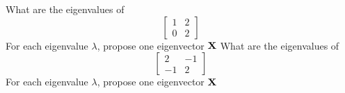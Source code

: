 

\bexo
What are the eigenvalues of 
\begin{equation*}
\left[
\begin{array}{cc}
1 & 2 \\
0 & 2
\end{array}
\right]
\end{equation*}
For each eigenvalue $\lambda$, propose one eigenvector $\textbf{X}$
\eexo{}
\bexo
What are the eigenvalues of 
\begin{equation*}
\left[
\begin{array}{cc}
2 & -1 \\
-1 & 2
\end{array}
\right]
\end{equation*}
For each eigenvalue $\lambda$, propose one eigenvector $\textbf{X}$
\eexo{}
